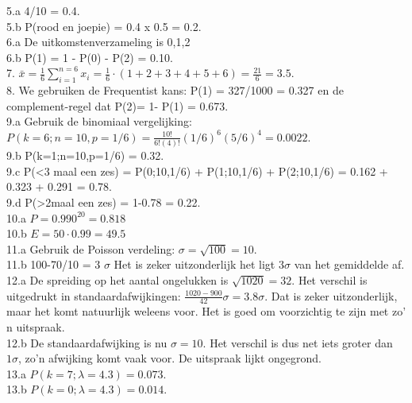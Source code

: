 5.a 4/10 = 0.4.\\
5.b P(rood en joepie) = 0.4 x 0.5 = 0.2.\\


6.a De uitkomstenverzameling is {0,1,2}\\
6.b P(1) = 1 - P(0) - P(2) = 0.10.\\


7. $\bar{x} = \frac{1}{6} \sum_{i=1}^{n=6} x_i = \frac{1}{6} \cdot (1+2+3+4+5+6) = \frac{21}{6} = 3.5$.\\


8. We gebruiken de Frequentist kans: P(1) = 327/1000 = 0.327 en de complement-regel dat P(2)= 1- P(1) = 0.673.\\


9.a Gebruik de binomiaal vergelijking: ${\displaystyle P(k=6;n=10,p=1/6) = \frac{10!}{6!(4)!} (1/6)^6 (5/6)^{4} = 0.0022} $.\\
9.b P(k=1;n=10,p=1/6) = 0.32.\\
9.c P(<3 maal een zes) = P(0;10,1/6) + P(1;10,1/6) + P(2;10,1/6) = 0.162 + 0.323 + 0.291 = 0.78.\\
9.d P(>2maal  een zes) = 1-0.78 = 0.22.\\


10.a $P = 0.990^{20} =  0.818$\\
10.b $E = 50\cdot 0.99 = 49.5$\\


11.a Gebruik de Poisson verdeling: $\sigma = \sqrt{100} = 10$.\\
11.b 100-70/10 = 3 $ \sigma $ Het is zeker uitzonderlijk het ligt $3\sigma$ van het gemiddelde af.\\


12.a De spreiding op het aantal ongelukken is $\sqrt{1020} = 32$. Het verschil is uitgedrukt in standaardafwijkingen: $\frac{1020-900}{42} \sigma = 3.8 \sigma$. Dat is zeker uitzonderlijk, maar het komt natuurlijk weleens voor. Het is goed om voorzichtig te zijn met zo' n uitspraak.\\
12.b De standaardafwijking is nu $\sigma = 10$. Het verschil is dus net iets groter dan $1\sigma$, zo'n afwijking komt vaak voor. De uitspraak lijkt ongegrond.\\


13.a $P(k=7;\lambda=4.3) =0.073$.\\
13.b $P(k=0;\lambda=4.3) =0.014$.\\

